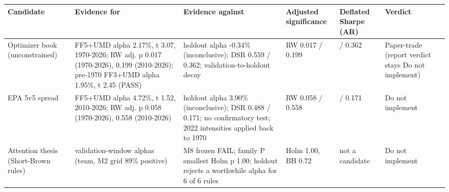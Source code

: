 \begin{adjustbox}{max width=\linewidth}
\begin{tabular}{>{\raggedright\arraybackslash}p{2.1cm}>{\raggedright\arraybackslash}p{3.3cm}>{\raggedright\arraybackslash}p{3.3cm}>{\raggedright\arraybackslash}p{1.7cm}>{\raggedright\arraybackslash}p{1.5cm}>{\raggedright\arraybackslash}p{1.9cm}}
\toprule
Candidate & Evidence for & Evidence against & Adjusted significance & Deflated Sharpe (AR) & Verdict \\
\midrule
Optimizer book (unconstrained) & FF5+UMD alpha 2.17\%, t 3.07, 1970-2026; RW adj. p 0.017 (1970-2026), 0.199 (2010-2026); pre-1970 FF3+UMD alpha 1.95\%, t 2.45 (PASS) & holdout alpha -0.34\% (inconclusive); DSR 0.559 / 0.362; validation-to-holdout decay & RW 0.017 / 0.199 & 0.559 / 0.362 & Paper-trade (report verdict stays Do not implement) \\
EPA 5v5 spread & FF5+UMD alpha 4.72\%, t 1.52, 2010-2026; RW adj. p 0.058 (1970-2026), 0.558 (2010-2026) & holdout alpha 3.90\% (inconclusive); DSR 0.488 / 0.171; no confirmatory test; 2022 intensities applied back to 1970 & RW 0.058 / 0.558 & 0.488 / 0.171 & Do not implement \\
Attention thesis (Short-Brown rules) & validation-window alphas (team, M2 grid 89\% positive) & M8 frozen FAIL; family P smallest Holm p 1.00; holdout rejects a worthwhile alpha for 6 of 6 rules & Holm 1.00, BH 0.72 & not a candidate & Do not implement \\
\bottomrule
\end{tabular}
\end{adjustbox}
\par{}
